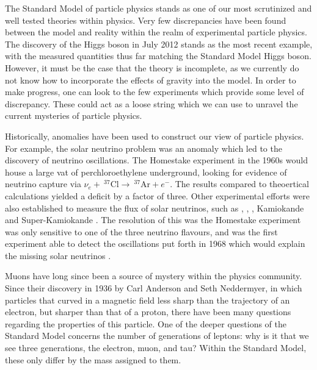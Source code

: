 \label{chapter:introduction}

The Standard Model of particle physics stands as one of our most scrutinized and well tested theories within physics.
Very few discrepancies have been found between the model and reality within the realm of experimental particle physics.
The discovery of the Higgs boson in July 2012 stands as the most recent example, with the measured quantities thus far matching the Standard Model Higgs boson.
However, it must be the case that the theory is incomplete, as we currently do not know how to incorporate the effects of gravity into the model.
In order to make progress, one can look to the few experiments which provide some level of discrepancy.
These could act as a loose string which we can use to unravel the current mysteries of particle physics.

Historically, anomalies have been used to construct our view of particle physics.
For example, the solar neutrino problem was an anomaly which led to the discovery of neutrino oscillations.
The Homestake experiment \cite{Davis:1968cp} in the 1960s would house a large vat of perchloroethylene underground, looking for evidence of neutrino capture via $\nu_e +~^{37}\textrm{Cl} \rightarrow~^{37}\textrm{Ar} + e^-$.
The results compared to theoertical calculations yielded a deficit by a factor of three.
Other experimental efforts were also established to measure the flux of solar neutrinos, such as \sage \cite{Abdurashitov:1999zd}, \gallex \cite{Hampel:1998xg}, \sno \cite{Boger:1999bb}, Kamiokande and Super-Kamiokande \cite{Fukuda:1996sz, Fukuda:2002pe}.
The resolution of this was the Homestake experiment was only sensitive to one of the three neutrino flavours, and \sno was the first experiment able to detect the oscillations put forth in 1968 which would explain the missing solar neutrinos \cite{Gribov:1968kq}.

Muons have long since been a source of mystery within the physics community.
Since their discovery in 1936 by Carl Anderson and Seth Neddermyer, in which particles that curved in a magnetic field less sharp than the trajectory of an electron, but sharper than that of a proton, there have been many questions regarding the properties of this particle.
One of the deeper questions of the Standard Model concerns the number of generations of leptons: why is it that we see three generations, the electron, muon, and tau? Within the Standard Model, these only differ by the mass assigned to them.


